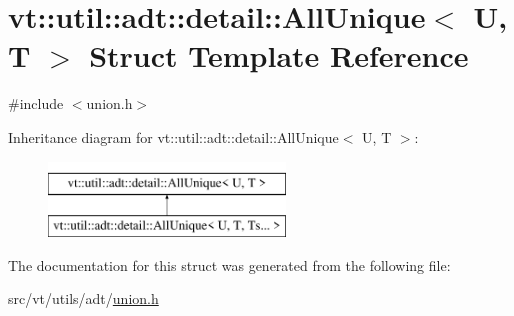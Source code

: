 \hypertarget{structvt_1_1util_1_1adt_1_1detail_1_1_all_unique_3_01_u_00_01_t_01_4}{}\section{vt\+:\+:util\+:\+:adt\+:\+:detail\+:\+:All\+Unique$<$ U, T $>$ Struct Template Reference}
\label{structvt_1_1util_1_1adt_1_1detail_1_1_all_unique_3_01_u_00_01_t_01_4}


{\ttfamily \#include $<$union.\+h$>$}

Inheritance diagram for vt\+:\+:util\+:\+:adt\+:\+:detail\+:\+:All\+Unique$<$ U, T $>$\+:\begin{figure}[H]
\begin{center}
\leavevmode
\includegraphics[height=2.000000cm]{structvt_1_1util_1_1adt_1_1detail_1_1_all_unique_3_01_u_00_01_t_01_4}
\end{center}
\end{figure}


The documentation for this struct was generated from the following file\+:\begin{DoxyCompactItemize}
\item 
src/vt/utils/adt/\hyperlink{union_8h}{union.\+h}\end{DoxyCompactItemize}
